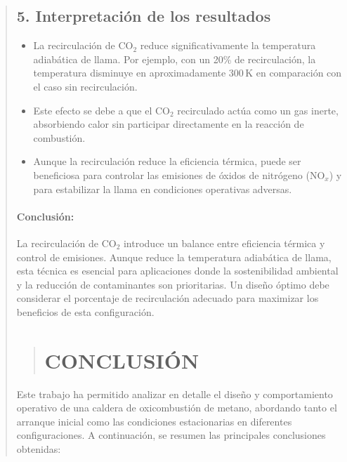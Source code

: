 \documentclass[11pt, a4paper]{article}
\begin{document}
\begin{quote}
\begin{center}
\begin{adjustwidth}{-1.7cm}{-1cm}
\subsection*{5. Interpretación de los resultados}

\begin{itemize}
    \item La recirculación de \(\text{CO}_2\) reduce significativamente la temperatura adiabática de llama. Por ejemplo, con un 20\% de recirculación, la temperatura disminuye en aproximadamente \(300 \, \text{K}\) en comparación con el caso sin recirculación.
    \item Este efecto se debe a que el \(\text{CO}_2\) recirculado actúa como un gas inerte, absorbiendo calor sin participar directamente en la reacción de combustión.
    \item Aunque la recirculación reduce la eficiencia térmica, puede ser beneficiosa para controlar las emisiones de óxidos de nitrógeno (\(\text{NO}_x\)) y para estabilizar la llama en condiciones operativas adversas.
\end{itemize}

\paragraph{Conclusión:}
La recirculación de \(\text{CO}_2\) introduce un balance entre eficiencia térmica y control de emisiones. Aunque reduce la temperatura adiabática de llama, esta técnica es esencial para aplicaciones donde la sostenibilidad ambiental y la reducción de contaminantes son prioritarias. Un diseño óptimo debe considerar el porcentaje de recirculación adecuado para maximizar los beneficios de esta configuración.

\newpage



\newpage
\begin{quote}
\setlength{\parskip}{1pt} %
\vspace*{0.3cm} %
\hypertarget{conclusion}{%
\section{CONCLUSIÓN}\label{conclusion}}
\end{quote}
\vspace*{1cm} %

Este trabajo ha permitido analizar en detalle el diseño y comportamiento operativo de una caldera de oxicombustión de metano, abordando tanto el arranque inicial como las condiciones estacionarias en diferentes configuraciones. A continuación, se resumen las principales conclusiones obtenidas:


\end{adjustwidth}
\end{center}
\end{quote}
\end{document}
